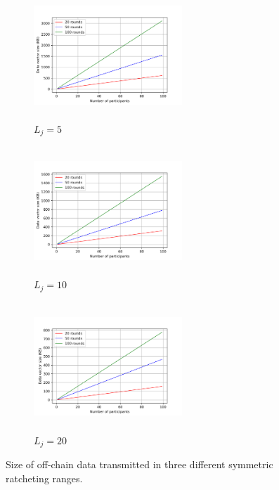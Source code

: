 \documentclass[a4paper,fleqn]{cas-dc}
\begin{document}
\begin{figure}[b]
    \centering
    \begin{subfigure}[b]{0.3\textwidth}
        \centering
        \includegraphics[width=2.2in,height=1.9in]{Images/communication_cost5.png}
        \caption{$L_{j}=5$}
    \end{subfigure}
    \hspace{0.001\linewidth}
    \begin{subfigure}[b]{0.3\textwidth}
        \centering
        \includegraphics[width=2.2in,height=1.9in]{Images/communication_cost10.png}
        \caption{$L_{j}=10$}
    \end{subfigure}
    \hspace{0.001\linewidth}
    \begin{subfigure}[b]{0.3\textwidth}
        \centering
        \includegraphics[width=2.2in,height=1.9in]{Images/communication_cost20.png}
        \caption{$L_{j}=20$}
    \end{subfigure}
    \caption{Size of off-chain data transmitted in three different symmetric ratcheting ranges.}
    \label{fig: size_of_data_transmitted}
\end{figure}
\end{document}
